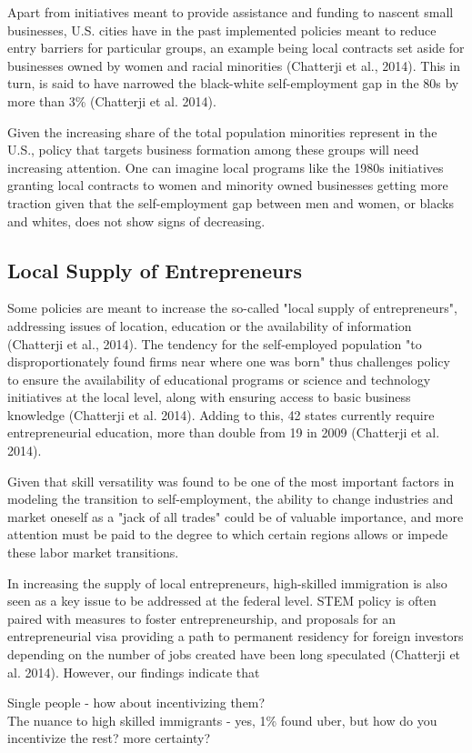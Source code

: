 Apart from initiatives meant to provide assistance and funding to nascent small businesses, U.S. cities have in the past implemented policies meant to reduce entry barriers for particular groups, an example being local contracts set aside for businesses owned by women and racial minorities (Chatterji et al., 2014). This in turn, is said to have narrowed the black-white self-employment gap in the 80s by more than 3\% (Chatterji et al. 2014).

Given the increasing share of the total population minorities represent in the U.S., policy that targets business formation among these groups will need increasing attention. One can imagine local programs like the 1980s initiatives granting local contracts to women and minority owned businesses getting more traction given that the self-employment gap between men and women, or blacks and whites, does not show signs of decreasing.  

\subsection{Local Supply of Entrepreneurs}

Some policies are meant to increase the so-called "local supply of entrepreneurs", addressing issues of location, education or the availability of information (Chatterji et al., 2014). The tendency for the self-employed population "to disproportionately found firms near where one was born" thus challenges policy to ensure the availability of educational programs or science and technology initiatives at the local level, along with ensuring access to basic business knowledge (Chatterji et al. 2014).  Adding to this, 42 states currently require entrepreneurial education, more than double from 19 in 2009 (Chatterji et al. 2014). 

Given that skill versatility was found to be one of the most important factors in modeling the transition to self-employment, the ability to change industries and market oneself as a "jack of all trades" could be of valuable importance, and more attention must be paid to the degree to which certain regions allows or impede these labor market transitions.

In increasing the supply of local entrepreneurs, high-skilled immigration is also seen as a key issue to be addressed at the federal level. STEM policy is often paired with measures to foster entrepreneurship, and proposals for an entrepreneurial visa providing a path to permanent residency for foreign investors depending on the number of jobs created have been long speculated (Chatterji et al. 2014). However, our findings indicate that 


Single people - how about incentivizing them? \\
The nuance to high skilled immigrants - yes, 1\% found uber, but how do you incentivize the rest? more certainty? 















